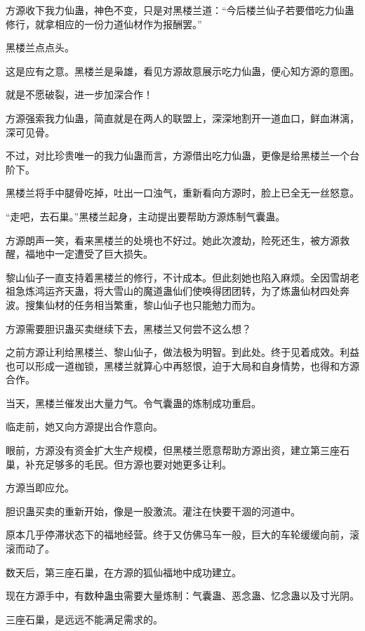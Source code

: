 
\begin{this_body}

方源收下我力仙蛊，神色不变，只是对黑楼兰道：“今后楼兰仙子若要借吃力仙蛊修行，就拿相应的一份力道仙材作为报酬罢。”

黑楼兰点点头。

这是应有之意。黑楼兰是枭雄，看见方源故意展示吃力仙蛊，便心知方源的意图。

就是不愿破裂，进一步加深合作！

方源强索我力仙蛊，简直就是在两人的联盟上，深深地割开一道血口，鲜血淋漓，深可见骨。

不过，对比珍贵唯一的我力仙蛊而言，方源借出吃力仙蛊，更像是给黑楼兰一个台阶下。

黑楼兰将手中腿骨吃掉，吐出一口浊气，重新看向方源时，脸上已全无一丝怒意。

“走吧，去石巢。”黑楼兰起身，主动提出要帮助方源炼制气囊蛊。

方源朗声一笑，看来黑楼兰的处境也不好过。她此次渡劫，险死还生，被方源救醒，福地中一定遭受了巨大损失。

黎山仙子一直支持着黑楼兰的修行，不计成本。但此刻她也陷入麻烦。全因雪胡老祖急炼鸿运齐天蛊，将大雪山的魔道蛊仙们使唤得团团转，为了炼蛊仙材四处奔波。搜集仙材的任务相当繁重，黎山仙子也只能勉力而为。

方源需要胆识蛊买卖继续下去，黑楼兰又何尝不这么想？

之前方源让利给黑楼兰、黎山仙子，做法极为明智。到此处。终于见着成效。利益也可以形成一道枷锁，黑楼兰就算心中再怒恨，迫于大局和自身情势，也得和方源合作。

当天，黑楼兰催发出大量力气。令气囊蛊的炼制成功重启。

临走前，她又向方源提出合作意向。

眼前，方源没有资金扩大生产规模，但黑楼兰愿意帮助方源出资，建立第三座石巢，补充足够多的毛民。但方源也要对她更多让利。

方源当即应允。

胆识蛊买卖的重新开始，像是一股激流。灌注在快要干涸的河道中。

原本几乎停滞状态下的福地经营。终于又仿佛马车一般，巨大的车轮缓缓向前，滚滚而动了。

数天后，第三座石巢，在方源的狐仙福地中成功建立。

现在方源手中，有数种蛊虫需要大量炼制：气囊蛊、恶念蛊、忆念蛊以及寸光阴。

三座石巢，是远远不能满足需求的。


\end{this_body}
